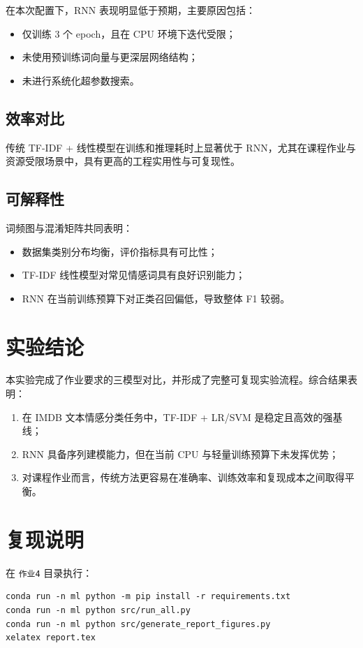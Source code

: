 \documentclass[UTF8,a4paper,12pt]{ctexart}
\begin{document}
在本次配置下，RNN 表现明显低于预期，主要原因包括：
\begin{itemize}
    \item 仅训练 3 个 epoch，且在 CPU 环境下迭代受限；
    \item 未使用预训练词向量与更深层网络结构；
    \item 未进行系统化超参数搜索。
\end{itemize}

\subsection{效率对比}
传统 TF-IDF + 线性模型在训练和推理耗时上显著优于 RNN，尤其在课程作业与资源受限场景中，具有更高的工程实用性与可复现性。

\subsection{可解释性}
词频图与混淆矩阵共同表明：
\begin{itemize}
    \item 数据集类别分布均衡，评价指标具有可比性；
    \item TF-IDF 线性模型对常见情感词具有良好识别能力；
    \item RNN 在当前训练预算下对正类召回偏低，导致整体 F1 较弱。
\end{itemize}

\section{实验结论}
本实验完成了作业要求的三模型对比，并形成了完整可复现实验流程。综合结果表明：
\begin{enumerate}
    \item 在 IMDB 文本情感分类任务中，TF-IDF + LR/SVM 是稳定且高效的强基线；
    \item RNN 具备序列建模能力，但在当前 CPU 与轻量训练预算下未发挥优势；
    \item 对课程作业而言，传统方法更容易在准确率、训练效率和复现成本之间取得平衡。
\end{enumerate}

\section{复现说明}
在 \texttt{作业4} 目录执行：
\begin{verbatim}
conda run -n ml python -m pip install -r requirements.txt
conda run -n ml python src/run_all.py
conda run -n ml python src/generate_report_figures.py
xelatex report.tex
\end{verbatim}
\end{document}
